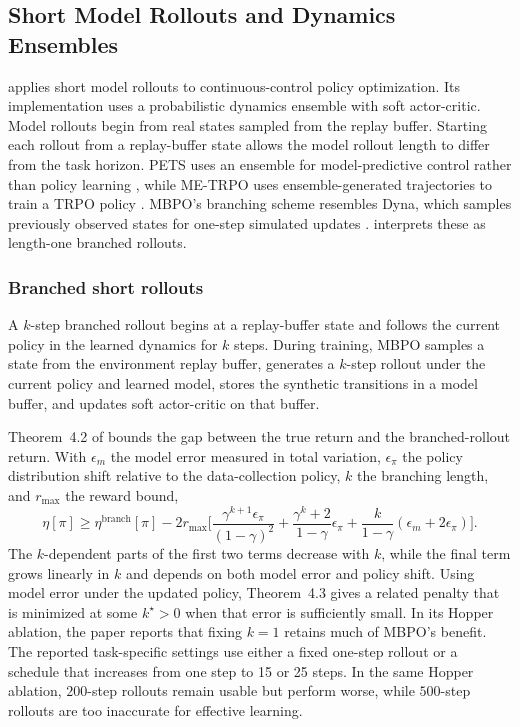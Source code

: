 \subsection{Short Model Rollouts and Dynamics Ensembles}
\label{section:fc_mbpo}

\citet{janner2019model} applies short model rollouts to continuous-control policy optimization. Its implementation uses a probabilistic dynamics ensemble with soft actor-critic. Model rollouts begin from real states sampled from the replay buffer. Starting each rollout from a replay-buffer state allows the model rollout length to differ from the task horizon. PETS uses an ensemble for model-predictive control rather than policy learning \citep{Chua2018PETS}, while ME-TRPO uses ensemble-generated trajectories to train a TRPO policy \citep{Kurutach2018}. MBPO's branching scheme resembles Dyna, which samples previously observed states for one-step simulated updates \citep{sutton1990}. \citet{janner2019model} interprets these as length-one branched rollouts.

\subsubsection{Branched short rollouts}
\label{section:fc_mbpo_branching}

A $k$-step branched rollout begins at a replay-buffer state and follows the current policy in the learned dynamics for $k$ steps. During training, MBPO samples a state from the environment replay buffer, generates a $k$-step rollout under the current policy and learned model, stores the synthetic transitions in a model buffer, and updates soft actor-critic on that buffer.

Theorem~4.2 of \citet{janner2019model} bounds the gap between the true return and the branched-rollout return. With $\epsilon_m$ the model error measured in total variation, $\epsilon_\pi$ the policy distribution shift relative to the data-collection policy, $k$ the branching length, and $r_{\max}$ the reward bound,
\[ \eta[\pi] \ge \eta^{\text{branch}}[\pi] - 2 r_{\max} \Big[ \frac{\gamma^{k+1} \epsilon_\pi}{(1 - \gamma)^2} + \frac{\gamma^k + 2}{1 - \gamma} \epsilon_\pi + \frac{k}{1 - \gamma}(\epsilon_m + 2 \epsilon_\pi) \Big]. \]
The $k$-dependent parts of the first two terms decrease with $k$, while the final term grows linearly in $k$ and depends on both model error and policy shift. Using model error under the updated policy, Theorem~4.3 gives a related penalty that is minimized at some $k^\star>0$ when that error is sufficiently small. In its Hopper ablation, the paper reports that fixing $k=1$ retains much of MBPO's benefit. The reported task-specific settings use either a fixed one-step rollout or a schedule that increases from one step to 15 or 25 steps. In the same Hopper ablation, $200$-step rollouts remain usable but perform worse, while $500$-step rollouts are too inaccurate for effective learning.

